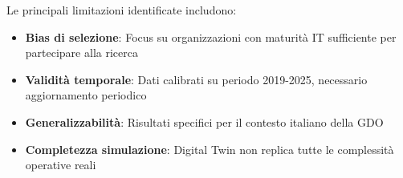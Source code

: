 Le principali limitazioni identificate includono:

\begin{itemize}
    \item \textbf{Bias di selezione}: Focus su organizzazioni con maturità IT sufficiente per partecipare alla ricerca
    \item \textbf{Validità temporale}: Dati calibrati su periodo 2019-2025, necessario aggiornamento periodico
    \item \textbf{Generalizzabilità}: Risultati specifici per il contesto italiano della GDO
    \item \textbf{Completezza simulazione}: Digital Twin non replica tutte le complessità operative reali
\end{itemize}

